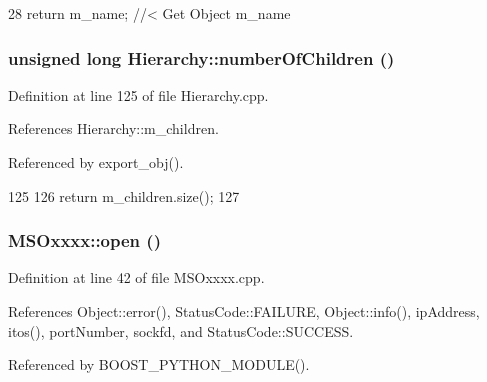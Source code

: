 \begin{DoxyCode}
28 { return m_name; } //< Get Object m_name
\end{DoxyCode}
\hypertarget{classHierarchy_ab16e84de65fd84e14001a6cf941c8be4}{
\subsubsection[{numberOfChildren}]{\setlength{\rightskip}{0pt plus 5cm}unsigned long Hierarchy::numberOfChildren ()}}
\label{classHierarchy_ab16e84de65fd84e14001a6cf941c8be4}


Definition at line 125 of file Hierarchy.cpp.

References Hierarchy::m\_\-children.

Referenced by export\_\-obj().


\begin{DoxyCode}
125                                            {
126   return m_children.size();
127 }
\end{DoxyCode}
\hypertarget{classMSOxxxx_a4acff38c6f55795533c4d6b4cef6106b}{
\subsubsection[{open}]{ MSOxxxx::open ()}}
\label{classMSOxxxx_a4acff38c6f55795533c4d6b4cef6106b}


Definition at line 42 of file MSOxxxx.cpp.

References Object::error(), StatusCode::FAILURE, Object::info(), ipAddress, itos(), portNumber, sockfd, and StatusCode::SUCCESS.

Referenced by BOOST\_\-PYTHON\_\-MODULE().


